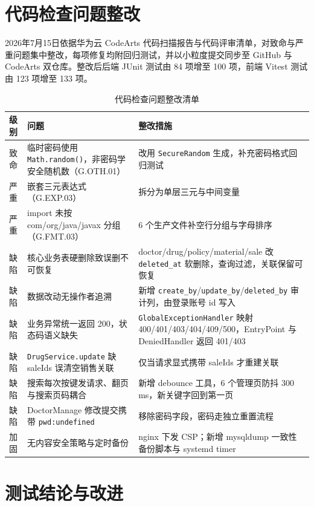 \documentclass[UTF8,a4paper,12pt,openany,fontset=windows]{ctexrep}
\begin{document}
\section{代码检查问题整改}

2026年7月15日依据华为云 CodeArts 代码扫描报告与代码评审清单，对致命与严重问题集中整改，每项修复均附回归测试，并以小粒度提交同步至 GitHub 与 CodeArts 双仓库。整改后后端 JUnit 测试由 84 项增至 100 项，前端 Vitest 测试由 123 项增至 133 项。

\begin{table}[H]
  \centering
  \caption{代码检查问题整改清单}
  \begin{tabularx}{\textwidth}{p{1.1cm}p{3.6cm}L}
    \toprule
    级别 & 问题 & 整改措施 \\
    \midrule
    致命 & 临时密码使用 \texttt{Math.random()}，非密码学安全随机数（G.OTH.01） & 改用 \texttt{SecureRandom} 生成，补充密码格式回归测试 \\
    严重 & 嵌套三元表达式（G.EXP.03） & 拆分为单层三元与中间变量 \\
    严重 & import 未按 com/org/java/javax 分组（G.FMT.03） & 6 个生产文件补空行分组与字母排序 \\
    缺陷 & 核心业务表硬删除致误删不可恢复 & doctor/drug/policy/material/sale 改 \texttt{deleted\_at} 软删除，查询过滤，关联保留可恢复 \\
    缺陷 & 数据改动无操作者追溯 & 新增 \texttt{create\_by}/\texttt{update\_by}/\texttt{deleted\_by} 审计列，由登录账号 id 写入 \\
    缺陷 & 业务异常统一返回 200，状态码语义缺失 & \texttt{GlobalExceptionHandler} 映射 400/401/403/404/409/500，EntryPoint 与 DeniedHandler 返回 401/403 \\
    缺陷 & \texttt{DrugService.update} 缺 saleIds 误清空销售关联 & 仅当请求显式携带 saleIds 才重建关联 \\
    缺陷 & 搜索每次按键发请求、翻页与搜索页码耦合 & 新增 debounce 工具，6 个管理页防抖 300\,ms，新关键字回到第一页 \\
    缺陷 & DoctorManage 修改提交携带 \texttt{pwd:undefined} & 移除密码字段，密码走独立重置流程 \\
    加固 & 无内容安全策略与定时备份 & nginx 下发 CSP；新增 mysqldump 一致性备份脚本与 systemd timer \\
    \bottomrule
  \end{tabularx}
\end{table}

\section{测试结论与改进}
\end{document}
